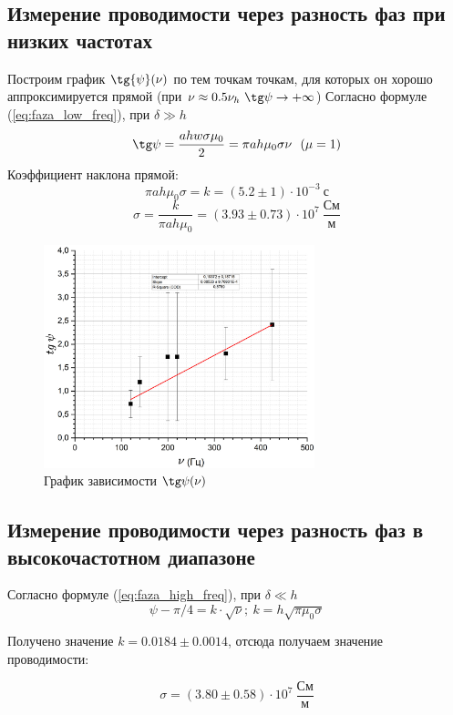 \documentclass{article}
\begin{document}
	\subsection*{Измерение проводимости через разность фаз при низких частотах}
	Построим график $\tg{\psi} (\nu)$ по тем точкам точкам, для которых он хорошо аппроксимируется прямой (при $\nu \approx 0.5 \nu_h \ \tg \psi \rightarrow +\infty$) 
	Согласно формуле (\ref{eq:faza_low_freq}), при $\delta \gg h$
	\begin{equation*}
		\tg \psi = \frac{ahw \sigma \mu_0}{2} = \pi ah\mu_0\sigma \nu \ \ (\mu = 1)
	\end{equation*}
	Коэффициент наклона прямой: \[\pi ah \mu_0\sigma = k = (5.2 \pm 1) \cdot 10^{-3} \ \text{с}\]
	\[\sigma = \frac{k}{\pi ah \mu_0} = (3.93 \pm 0.73) \cdot 10^7 \ \frac{\text{См}}{\text{м}}\]
	\begin{figure}[H]
		\centering
		\includegraphics[width=0.7\textwidth]{15_13_28.png}
		\caption{График зависимости $\tg \psi (\nu)$}\label{fig:tg_psi_nu_line}
	\end{figure}

	\subsection*{Измерение проводимости через разность фаз в высокочастотном диапазоне}
	Согласно формуле (\ref{eq:faza_high_freq}), при $\delta \ll h$
	\begin{equation*}
		\psi - \pi/4 = k\cdot \sqrt{\nu}; \ k = h\sqrt{\pi\mu_0\sigma}
	\end{equation*}
	
	Получено значение $k = 0.0184 \pm 0.0014$, отсюда получаем значение проводимости:
	
	\begin{equation}
		\sigma = (3.80 \pm 0.58) \cdot 10^7 \ \frac{\text{См}}{\text{м}}
	\end{equation}
	
\end{document}
